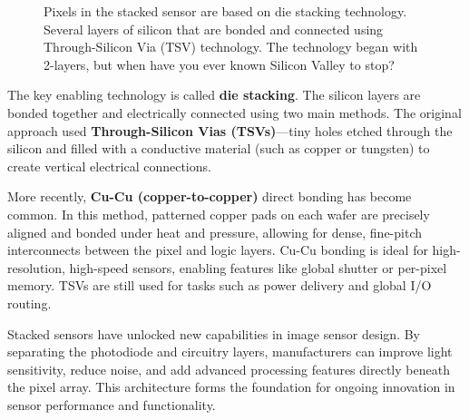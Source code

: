 \documentclass[
  letterpaper,
]{book}
\begin{document}
\begin{figure}


\caption{\label{fig-sensor-stacked}Pixels in the stacked sensor are
based on die stacking technology. Several layers of silicon that are
bonded and connected using Through-Silicon Via (TSV) technology. The
technology began with 2-layers, but when have you ever known Silicon
Valley to stop?}

\end{figure}%

The key enabling technology is called \textbf{die stacking}. The silicon
layers are bonded together and electrically connected using two main
methods. The original approach used \textbf{Through-Silicon Vias
(TSVs)}---tiny holes etched through the silicon and filled with a
conductive material (such as copper or tungsten) to create vertical
electrical connections.

More recently, \textbf{Cu-Cu (copper-to-copper)} direct bonding has
become common. In this method, patterned copper pads on each wafer are
precisely aligned and bonded under heat and pressure, allowing for
dense, fine-pitch interconnects between the pixel and logic layers.
Cu-Cu bonding is ideal for high-resolution, high-speed sensors, enabling
features like global shutter or per-pixel memory. TSVs are still used
for tasks such as power delivery and global I/O routing.

Stacked sensors have unlocked new capabilities in image sensor design.
By separating the photodiode and circuitry layers, manufacturers can
improve light sensitivity, reduce noise, and add advanced processing
features directly beneath the pixel array. This architecture forms the
foundation for ongoing innovation in sensor performance and
functionality.
\end{document}
